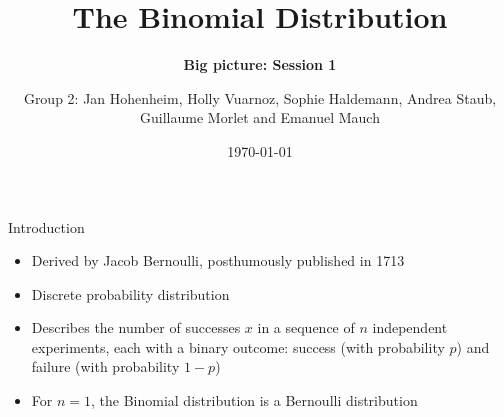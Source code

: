 \documentclass[english]{beamer}\usepackage[]{graphicx}\usepackage[]{xcolor}
\title[The Binomial Distribution]{The Binomial Distribution}
\subtitle{\textbf{Big picture: Session 1}}
\author{Group 2: Jan Hohenheim, Holly Vuarnoz, Sophie Haldemann,
Andrea Staub, Guillaume Morlet and Emanuel Mauch}
\date{\today}
\begin{document}
\maketitle


\begin{frame}{Introduction}

\begin{itemize}

\item Derived by Jacob Bernoulli, posthumously published in 1713
\item Discrete probability distribution
\item Describes the \textcolor{mylinkcolor}{number of successes $x$} in a sequence of
\textcolor{mylinkcolor}{$n$ independent experiments}, each with a binary outcome:
success (with probability $p$) and failure (with probability $1-p$)
\item For $n=1$, the Binomial distribution is a Bernoulli distribution

\end{itemize}

\end{frame}
\end{document}
